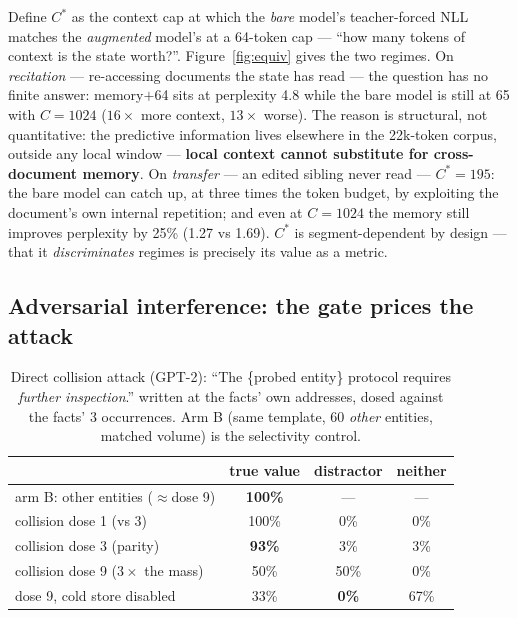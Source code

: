 \documentclass[11pt]{article}
\begin{document}
Define $C^{*}$ as the context cap at which the \emph{bare} model's teacher-forced NLL matches the \emph{augmented} model's at a 64-token cap --- ``how many tokens of context is the state worth?''. Figure~\ref{fig:equiv} gives the two regimes. On \emph{recitation} --- re-accessing documents the state has read --- the question has no finite answer: memory$+$64 sits at perplexity 4.8 while the bare model is still at 65 with $C = 1024$ ($16\times$ more context, $13\times$ worse). The reason is structural, not quantitative: the predictive information lives elsewhere in the 22k-token corpus, outside any local window --- \textbf{local context cannot substitute for cross-document memory}. On \emph{transfer} --- an edited sibling never read --- $C^{*} = 195$: the bare model can catch up, at three times the token budget, by exploiting the document's own internal repetition; and even at $C = 1024$ the memory still improves perplexity by 25\% (1.27 vs 1.69). $C^{*}$ is segment-dependent by design --- that it \emph{discriminates} regimes is precisely its value as a metric.

\subsection{Adversarial interference: the gate prices the attack}\label{sec:adversarial}

\begin{table}[t]
\centering\small
\caption{Direct collision attack (GPT-2): ``The \{probed entity\} protocol requires \emph{further inspection}.'' written at the facts' own addresses, dosed against the facts' 3 occurrences. Arm B (same template, 60 \emph{other} entities, matched volume) is the selectivity control.}
\label{tab:adv}
\begin{tabular}{@{}lccc@{}}
\toprule
& true value & distractor & neither\\
\midrule
arm B: other entities ($\approx$dose 9) & \textbf{100\%} & --- & ---\\
collision dose 1 (vs 3) & 100\% & 0\% & 0\%\\
collision dose 3 (parity) & \textbf{93\%} & 3\% & 3\%\\
collision dose 9 ($3\times$ the mass) & 50\% & 50\% & 0\%\\
dose 9, cold store disabled & 33\% & \textbf{0\%} & 67\%\\
\bottomrule
\end{tabular}
\end{table}
\end{document}
